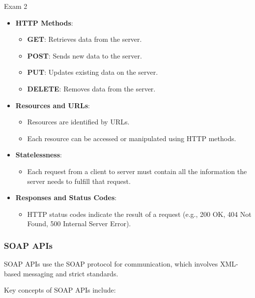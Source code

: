 \begin{examnotes}{Exam 2}
\begin{highlight}
        \begin{itemize}
            \item \textbf{HTTP Methods}:
                \begin{itemize}
                    \item \textbf{GET}: Retrieves data from the server.
                    \item \textbf{POST}: Sends new data to the server.
                    \item \textbf{PUT}: Updates existing data on the server.
                    \item \textbf{DELETE}: Removes data from the server.
                \end{itemize}
            \item \textbf{Resources and URLs}:
                \begin{itemize}
                    \item Resources are identified by URLs.
                    \item Each resource can be accessed or manipulated using HTTP methods.
                \end{itemize}
            \item \textbf{Statelessness}:
                \begin{itemize}
                    \item Each request from a client to server must contain all the information the server needs to fulfill that request.
                \end{itemize}
            \item \textbf{Responses and Status Codes}:
                \begin{itemize}
                    \item HTTP status codes indicate the result of a request (e.g., 200 OK, 404 Not Found, 500 Internal Server Error).
                \end{itemize}
        \end{itemize}
    \end{highlight}
    
    \subsubsection*{SOAP APIs}
    
    SOAP APIs use the SOAP protocol for communication, which involves XML-based messaging and strict standards.
    
    \begin{highlight}
        Key concepts of SOAP APIs include:
        

\end{highlight}
\end{examnotes}
